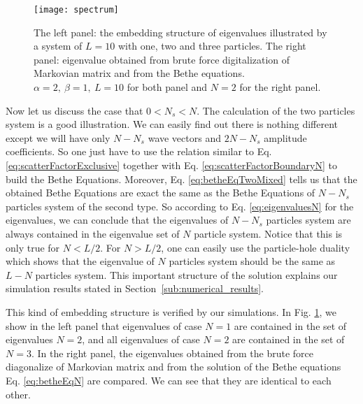 \begin{figure}[htpb]
    \centering
    \texttt{[image: spectrum]}
    \caption{The left panel: the embedding structure of eigenvalues illustrated by a system of $L=10$ with one, two and three particles. The right panel: eigenvalue obtained from brute force digitalization of Markovian matrix and from the Bethe equations. $\alpha=2,~\beta=1,~L=10$ for both panel and $N=2$ for the right panel.}
    \label{fig:spectrum}
\end{figure}
Now let us discuss the case that $0<N_s<N$. The calculation of the two particles system is a good illustration. We can easily find out there is nothing different except we will have only $N-N_s$ wave vectors and $2N-N_s$ amplitude coefficients. So one just have to use the relation similar to Eq.  \eqref{eq:scatterFactorExclusive} together with Eq.  \eqref{eq:scatterFactorBoundaryN} to build the Bethe Equations. 
Moreover, Eq.  \eqref{eq:betheEqTwoMixed} tells us that the obtained Bethe Equations are exact the same as the Bethe Equations of $N-N_s$ particles system of the second type. So according to Eq. \eqref{eq:eigenvaluesN} for the eigenvalues, we can conclude that the eigenvalues of $N-N_s$ particles system are always contained in the eigenvalue set of $N$ particle system. 
Notice that this is only true for $N<L/2$. For $N>L/2$, one can easily use the particle-hole duality which shows that the eigenvalue of $N$ particles system should be the same as $L-N$ particles system.
This important structure of the solution explains our simulation results stated in Section~\ref{sub:numerical_results}.

This kind of embedding structure is verified by our simulations.  In Fig. \ref{fig:spectrum}, we show in the left panel that eigenvalues of case $N=1$ are contained in the set of eigenvalues $N=2$, and all eigenvalues of case $N=2$ are contained in the set of $N=3$.  In the right panel, the eigenvalues obtained from the brute force diagonalize of Markovian matrix and from the solution of the Bethe equations Eq. \eqref{eq:betheEqN} are compared. We can see that they are identical to each other. 

